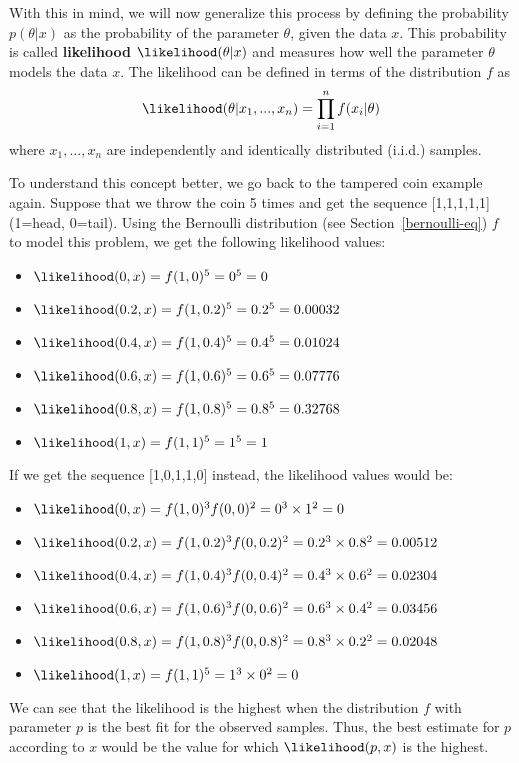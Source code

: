 With this in mind, we will now generalize this process by defining the probability $p(\theta|x)$ as the probability of the parameter $\theta$, given the data $x$. This probability is called {\bf likelihood} $\likelihood(\theta|x)$ and measures how well the parameter $\theta$ models the data $x$. The likelihood can be defined in terms of the distribution $f$ as
\begin{equation*}
\likelihood(\theta|x_1,...,x_n)=\prod_{i=1}^n f(x_i|\theta)
\end{equation*}
where $x_1,...,x_n$ are independently and identically distributed (i.i.d.) samples.

To understand this concept better, we go back to the tampered coin example again. Suppose that we throw the coin 5 times and get the sequence [1,1,1,1,1] (1=head, 0=tail). Using the Bernoulli distribution (see Section~\ref{bernoulli-eq}) $f$ to model this problem, we get the following likelihood values:
\begin{itemize}
\item $\likelihood(0,x) = f(1,0)^5 = 0^5 = 0$
\item $\likelihood(0.2,x) = f(1,0.2)^5 = 0.2^5 = 0.00032$
\item $\likelihood(0.4,x) = f(1,0.4)^5 = 0.4^5 = 0.01024$
\item $\likelihood(0.6,x) = f(1,0.6)^5 = 0.6^5 = 0.07776$
\item $\likelihood(0.8,x) = f(1,0.8)^5 = 0.8^5 = 0.32768$
\item $\likelihood(1,x) = f(1,1)^5 = 1^5 = 1$
\end{itemize}

If we get the sequence [1,0,1,1,0] instead, the likelihood values would be:
\begin{itemize}
\item $\likelihood(0,x) = f(1,0)^3f(0,0)^2 = 0^3\times 1^2 = 0$
\item $\likelihood(0.2,x) = f(1,0.2)^3f(0,0.2)^2 = 0.2^3\times 0.8^2 = 0.00512$
\item $\likelihood(0.4,x) = f(1,0.4)^3f(0,0.4)^2 = 0.4^3\times 0.6^2 = 0.02304$
\item $\likelihood(0.6,x) = f(1,0.6)^3f(0,0.6)^2 = 0.6^3\times 0.4^2 = 0.03456$
\item $\likelihood(0.8,x) = f(1,0.8)^3f(0,0.8)^2 = 0.8^3\times 0.2^2 = 0.02048$
\item $\likelihood(1,x) = f(1,1)^5 = 1^3\times 0^2 = 0$
\end{itemize}

We can see that the likelihood is the highest when the distribution $f$ with parameter $p$ is the best fit for the observed samples. Thus, the best estimate for $p$ according to $x$ would be the value for which $\likelihood(p,x)$ is the highest. 


